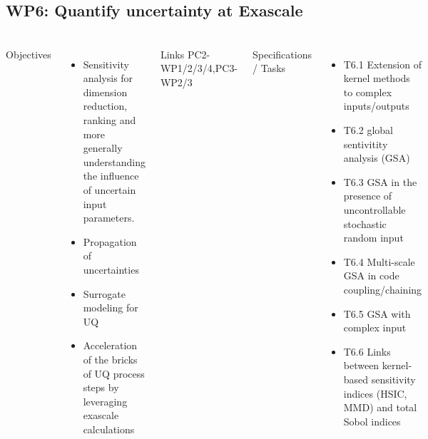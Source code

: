 \subsection{WP6: Quantify uncertainty at Exascale}
\begin{frame}
  \frametitle{\insertsectionhead}
  \framesubtitle{\insertsubsectionhead}
  \footnotesize
  \begin{columns}
    Objectives
    \begin{itemize}
      \item Sensitivity analysis for dimension reduction, ranking and more generally understanding the influence of uncertain input parameters.
       \item  Propagation of uncertainties
      \item Surrogate modeling for UQ
      \item Acceleration of the bricks of UQ process steps by leveraging exascale calculations
    \end{itemize}

    \begin{alertblock}{Links}
      PC2-WP1/2/3/4,PC3-WP2/3
    \end{alertblock}
    Specifications / Tasks
      \begin{itemize}
        \item T6.1 Extension of kernel methods to complex inputs/outputs
        \item T6.2 global sentivitity analysis (GSA) 
        \item T6.3 GSA in the presence of uncontrollable stochastic random input
        \item T6.4 Multi-scale GSA in code coupling/chaining
        \item T6.5 GSA with complex input 
        \item T6.6 Links between kernel-based sensitivity indices (HSIC, MMD) and total Sobol indices
      \end{itemize}


  \end{columns}
\end{frame}

